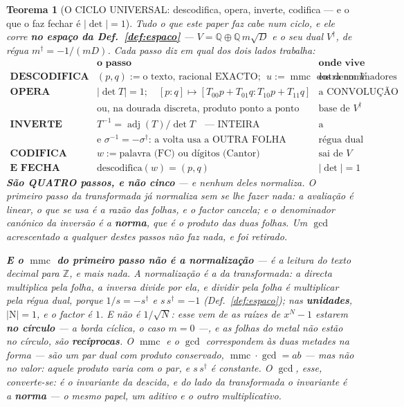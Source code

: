 \documentclass[11pt,a4paper]{article}
\newtheorem{teorema}{Teorema}
\newcommand{\abs}[1]{\lvert #1\rvert}
\newcommand{\dg}{^{\dagger}}
\begin{document}
\begin{teorema}[O CICLO UNIVERSAL: descodifica, opera, inverte, codifica --- e o que o
faz fechar é $\abs{\det}=1$]\label{thm:universal}
Tudo o que este paper faz cabe num ciclo, e ele corre \textbf{no espaço da
Def.~\ref{def:espaco}} --- $V=\mathbb{Q}\oplus\mathbb{Q}\,m\sqrt D$ e o seu dual $V\dg$, de
régua $m\dg=-1/(mD)$. Cada passo diz em qual dos dois lados trabalha:
\[
\boxed{
\begin{array}{lll}
 & \textbf{o passo} & \textbf{onde vive}\\[2pt]
\hline
\textbf{DESCODIFICA} & (p,q):=\text{o texto, racional EXACTO};\ \
u:=\operatorname{mmc}\text{ dos denominadores}
 & \text{entra em }V\\[3pt]
\textbf{OPERA} & \abs{\det T}=1;\quad [p:q]\mapsto[T_{00}p+T_{01}q:T_{10}p+T_{11}q]
 & \text{a CONVOLUÇÃO}\\[2pt]
 & \text{ou, na dourada discreta, produto ponto a ponto}
 & \text{base de }V\dg\\[3pt]
\textbf{INVERTE} & T^{-1}=\operatorname{adj}(T)/\det T\quad\text{--- INTEIRA}
 & \text{a DECONVOLUÇÃO}\\[2pt]
 & \text{e }\sigma^{-1}=-\sigma\dg\text{: a volta usa a OUTRA FOLHA}
 & \text{régua dual}\\[3pt]
\textbf{CODIFICA} & w:=\text{palavra (FC) ou dígitos (Cantor)}
 & \text{sai de }V\\[3pt]
\hline
\textbf{E FECHA} & \text{descodifica}(w)=(p,q) & \abs{\det}=1
\end{array}}
\]
\textbf{São QUATRO passos, e não cinco} --- e nenhum deles normaliza. \emph{O primeiro
passo da transformada já normaliza sem se lhe fazer nada}: a avaliação é linear, o que se
usa é a razão das folhas, e o factor cancela; e o denominador canónico da inversão é a
\textbf{norma}, que é o produto das duas folhas. Um $\gcd$ acrescentado a qualquer destes
passos não faz nada, e foi retirado.

\textbf{E o $\operatorname{mmc}$ do primeiro passo não é a normalização} --- é a
\emph{leitura} do texto decimal para $\mathbb{Z}$, e mais nada. A normalização é a da
transformada: a directa multiplica pela folha, a inversa divide por ela, e \emph{dividir
pela folha é multiplicar pela régua dual}, porque $1/s=-s\dg$ e $s\,s\dg=-1$
(Def.~\ref{def:espaco}); nas \textbf{unidades}, $\abs{\mathrm{N}}=1$, e o factor é $1$.
\emph{E não é $1/\sqrt N$}: esse vem de as raízes de $x^{N}-1$ estarem \textbf{no círculo}
--- a borda cíclica, o caso $m=0$ ---, e as folhas do metal não estão no círculo, são
\textbf{recíprocas}. O $\operatorname{mmc}$ e o $\gcd$ correspondem às duas metades
\emph{na forma} --- são um par dual com produto conservado, $\operatorname{mmc}\cdot\gcd
=ab$ --- mas não no valor: aquele produto \emph{varia} com o par, e $s\,s\dg$ é constante.
\emph{O $\gcd$, esse, converte-se}: é o invariante da descida, e do lado da transformada o
invariante é a \textbf{norma} --- o mesmo papel, um aditivo e o outro multiplicativo.


\end{teorema}
\end{document}

